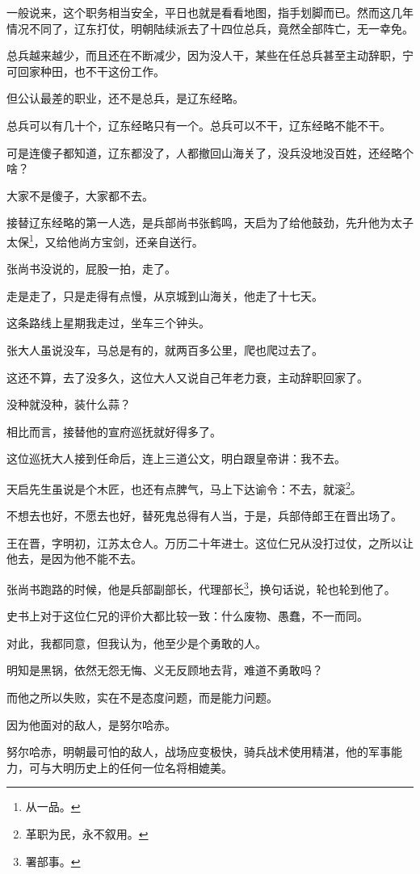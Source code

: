 \begin{multicols}{\theparacolNo}
		一般说来，这个职务相当安全，平日也就是看看地图，指手划脚而已。然而这几年情况不同了，辽东打仗，明朝陆续派去了十四位总兵，竟然全部阵亡，无一幸免。

		总兵越来越少，而且还在不断减少，因为没人干，某些在任总兵甚至主动辞职，宁可回家种田，也不干这份工作。

		但公认最差的职业，还不是总兵，是辽东经略。

		总兵可以有几十个，辽东经略只有一个。总兵可以不干，辽东经略不能不干。

		可是连傻子都知道，辽东都没了，人都撤回山海关了，没兵没地没百姓，还经略个啥？

		大家不是傻子，大家都不去。

		接替辽东经略的第一人选，是兵部尚书张鹤鸣，天启为了给他鼓劲，先升他为太子太保\footnote{从一品。}，又给他尚方宝剑，还亲自送行。

		张尚书没说的，屁股一拍，走了。

		走是走了，只是走得有点慢，从京城到山海关，他走了十七天。

		这条路线上星期我走过，坐车三个钟头。

		张大人虽说没车，马总是有的，就两百多公里，爬也爬过去了。

		这还不算，去了没多久，这位大人又说自己年老力衰，主动辞职回家了。

		没种就没种，装什么蒜？

		相比而言，接替他的宣府巡抚就好得多了。

		这位巡抚大人接到任命后，连上三道公文，明白跟皇帝讲：我不去。

		天启先生虽说是个木匠，也还有点脾气，马上下达谕令：不去，就滚\footnote{革职为民，永不叙用。}。

		不想去也好，不愿去也好，替死鬼总得有人当，于是，兵部侍郎王在晋出场了。

		王在晋，字明初，江苏太仓人。万历二十年进士。这位仁兄从没打过仗，之所以让他去，是因为他不能不去。

		张尚书跑路的时候，他是兵部副部长，代理部长\footnote{署部事。}，换句话说，轮也轮到他了。

		史书上对于这位仁兄的评价大都比较一致：什么废物、愚蠢，不一而同。

		对此，我都同意，但我认为，他至少是个勇敢的人。

		明知是黑锅，依然无怨无悔、义无反顾地去背，难道不勇敢吗？

		而他之所以失败，实在不是态度问题，而是能力问题。

		因为他面对的敌人，是努尔哈赤。

		努尔哈赤，明朝最可怕的敌人，战场应变极快，骑兵战术使用精湛，他的军事能力，可与大明历史上的任何一位名将相媲美。


\end{multicols}
